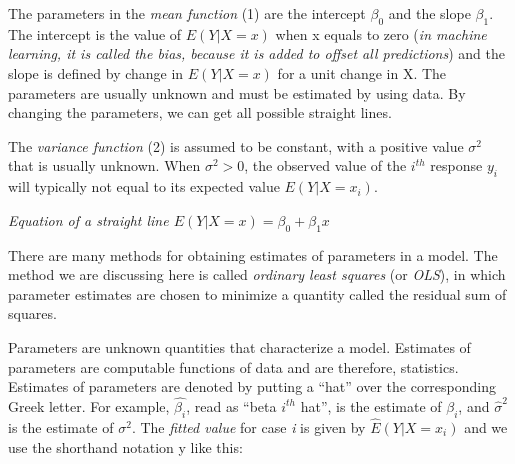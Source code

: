 \documentclass{article}
\begin{document}
    The parameters in the \textit{mean function} (1) are the intercept ${\beta _{0}}$ and the slope ${\beta_{1}}$. The intercept is the value of ${E(Y |X = x)}$ when x equals to zero (\textit{in machine learning, it is called the bias, because it is added to offset all predictions}) and the slope is defined by change in ${E(Y |X = x)}$ for a unit change in X. The parameters are usually unknown and must be estimated by using data. By changing the parameters, we can get all possible straight lines.
    
    The \textit{variance function} (2) is assumed to be constant, with a positive value ${\sigma ^ {2}}$ that is usually unknown. When ${\sigma ^ {2} > 0}$, the observed value of the ${i^{th}}$ response ${y_{i}}$ will typically not equal to its expected value ${E(Y|X=x_{i})}$. 
    \begin{center}
        
        \textit{Equation of a straight line ${E(Y|X=x)=\beta _{0} + \beta _{1} x}$} 
    \end{center}
    
    There are many methods for obtaining estimates of parameters in a model. The method we are discussing here is called\textit{ ordinary least squares} (or \textit{OLS}), in which parameter estimates are chosen to minimize a quantity called the residual sum of squares. 
	
    Parameters are unknown quantities that characterize a model. Estimates of parameters are computable functions of data and are therefore, statistics. Estimates of parameters are denoted by putting a “hat” over the corresponding Greek letter. For example, ${\hat{\beta _{i}}}$, read as “beta ${i^{th}}$ hat”, is the estimate of ${\beta _{i}}$, and ${\hat{\sigma} ^ {2}}$ is the estimate of ${\sigma ^ {2}}$. The \textit{fitted value} for case \textit{i} is given by ${\hat{E}(Y|X = x _{i})}$ and we use the shorthand notation y like this: 
    
\end{document}
